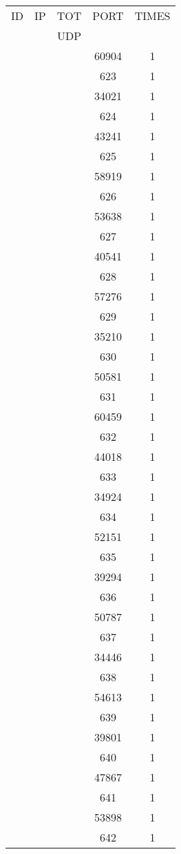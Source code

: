 \documentclass[a4paper]{scrartcl}
\begin{document}
\begin{minipage}[b]{0.5\linewidth}
\begin{tabular}{| c | c | c | c | c |}
\hline
ID & IP & TOT & PORT & TIMES \\ 
   &    & UDP &      &       \\ 
\hline
& & & 60904 & 1 \\ & & & 623 & 1 \\ & & & 34021 & 1 \\ & & & 624 & 1 \\ & & & 43241 & 1 \\ & & & 625 & 1 \\ & & & 58919 & 1 \\ & & & 626 & 1 \\ & & & 53638 & 1 \\ & & & 627 & 1 \\ & & & 40541 & 1 \\ & & & 628 & 1 \\ & & & 57276 & 1 \\ & & & 629 & 1 \\ & & & 35210 & 1 \\ & & & 630 & 1 \\ & & & 50581 & 1 \\ & & & 631 & 1 \\ & & & 60459 & 1 \\ & & & 632 & 1 \\ & & & 44018 & 1 \\ & & & 633 & 1 \\ & & & 34924 & 1 \\ & & & 634 & 1 \\ & & & 52151 & 1 \\ & & & 635 & 1 \\ & & & 39294 & 1 \\ & & & 636 & 1 \\ & & & 50787 & 1 \\ & & & 637 & 1 \\ & & & 34446 & 1 \\ & & & 638 & 1 \\ & & & 54613 & 1 \\ & & & 639 & 1 \\ & & & 39801 & 1 \\ & & & 640 & 1 \\ & & & 47867 & 1 \\ & & & 641 & 1 \\ & & & 53898 & 1 \\ & & & 642 & 1 \\ \hline\end{tabular}\end{minipage} \hfill\begin{minipage}[b]{0.5\linewidth}\begin{tabular}{| c | c | c | c | c |}

\end{tabular}
\end{minipage}
\end{document}
